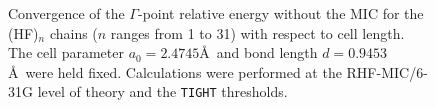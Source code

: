 \documentclass[prl,preprint,doublespace]{revtex4} %
\begin{document}
\begin{figure}[h]
  \caption{Convergence of the $\Gamma$-point relative energy without the MIC
    for the (HF)$_n$ chains ($n$ ranges from 1 to 31) with respect to cell length. 
    The cell parameter $a_0=2.4745$\AA~and bond length $d=0.9453$\AA~were held fixed. 
    Calculations were performed at the RHF-MIC/6-31G level of theory and the {\tt TIGHT} thresholds.}\label{Fig:CnvgEnergyNoMIC}
\end{figure}
\end{document}
